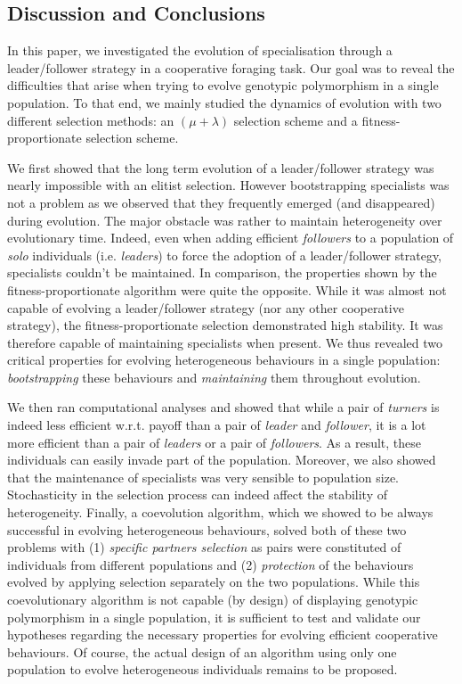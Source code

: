   \subsection{Discussion and Conclusions}
  \label{sec:discussion}
    In this paper, we investigated the evolution of specialisation through a leader/follower strategy in a cooperative foraging task. Our goal was to reveal the difficulties that arise when trying to evolve genotypic polymorphism in a single population. To that end, we mainly studied the dynamics of evolution with two different selection methods: an \((\mu + \lambda)\) selection scheme and a fitness-proportionate selection scheme.

    We first showed that the long term evolution of a leader/follower strategy was nearly impossible with an elitist selection. However bootstrapping specialists was not a problem as we observed that they frequently emerged (and disappeared) during evolution. The major obstacle was rather to maintain heterogeneity over evolutionary time. Indeed, even when adding efficient \emph{followers} to a population of \emph{solo} individuals (i.e. \emph{leaders}) to force the adoption of a leader/follower strategy, specialists couldn't be maintained. In comparison, the properties shown by the fitness-proportionate algorithm were quite the opposite. While it was almost not capable of evolving a leader/follower strategy (nor any other cooperative strategy), the fitness-proportionate selection demonstrated high stability. It was therefore capable of maintaining specialists when present. We thus revealed two critical properties for evolving heterogeneous behaviours in a single population: \emph{bootstrapping} these behaviours and \emph{maintaining} them throughout evolution.

    We then ran computational analyses and showed that while a pair of \emph{turners} is indeed less efficient w.r.t. payoff than a pair of \emph{leader} and \emph{follower}, it is a lot more efficient than a pair of \emph{leaders} or a pair of \emph{followers}. As a result, these individuals can easily invade part of the population. Moreover, we also showed that the maintenance of specialists was very sensible to population size. Stochasticity in the selection process can indeed affect the stability of heterogeneity. Finally, a coevolution algorithm, which we showed to be always successful in evolving heterogeneous behaviours, solved both of these two problems with (1) \emph{specific partners selection} as pairs were constituted of individuals from different populations and (2) \emph{protection} of the behaviours evolved by applying selection separately on the two populations. While this coevolutionary algorithm is not capable (by design) of displaying genotypic polymorphism in a single population, it is sufficient to test and validate our hypotheses regarding the necessary properties for evolving efficient cooperative behaviours. Of course, the actual design of an algorithm using only one population to evolve heterogeneous individuals remains to be proposed.
    
